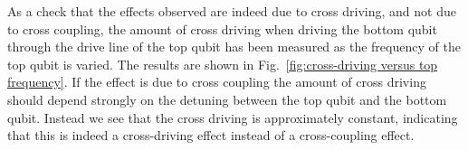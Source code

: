       As a check that the effects observed are indeed due to cross driving, and not due to cross coupling, the amount of cross driving when driving the bottom qubit through the drive line of the top qubit has been measured as the frequency of the top qubit is varied. The results are shown in Fig.~\ref{fig:cross-driving versus top frequency}. If the effect is due to cross coupling the amount of cross driving should depend strongly on the detuning between the top qubit and the bottom qubit. Instead we see that the cross driving is approximately constant, indicating that this is indeed a cross-driving effect instead of a cross-coupling effect.



